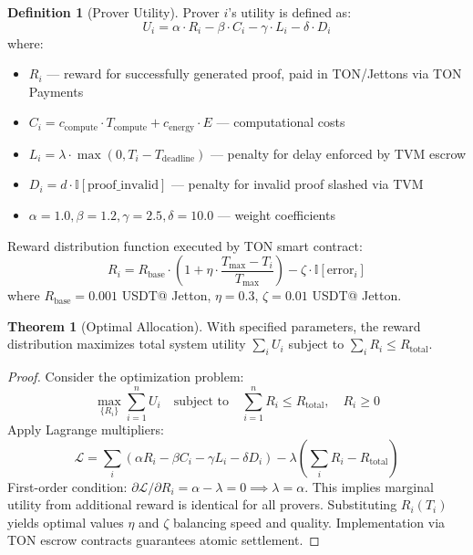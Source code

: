 \documentclass[12pt,a4paper]{article}
\theoremstyle{definition}
\newtheorem{definition}{Definition}[section]
\newtheorem{theorem}{Theorem}[section]
\theoremstyle{remark}
\begin{document}
\begin{definition}[Prover Utility]
Prover $i$'s utility is defined as:
\begin{equation}
U_i = \alpha \cdot R_i - \beta \cdot C_i - \gamma \cdot L_i - \delta \cdot D_i
\end{equation}
where:
\begin{itemize}[nosep]
    \item $R_i$ --- reward for successfully generated proof, paid in TON/Jettons via TON Payments
    \item $C_i = c_{\text{compute}} \cdot T_{\text{compute}} + c_{\text{energy}} \cdot E$ --- computational costs
    \item $L_i = \lambda \cdot \max(0, T_i - T_{\text{deadline}})$ --- penalty for delay enforced by TVM escrow
    \item $D_i = d \cdot \mathbb{I}[\text{proof\_invalid}]$ --- penalty for invalid proof slashed via TVM
    \item $\alpha = 1.0, \beta = 1.2, \gamma = 2.5, \delta = 10.0$ --- weight coefficients
\end{itemize}
\end{definition}

Reward distribution function executed by TON smart contract:
\begin{equation}
R_i = R_{\text{base}} \cdot \left(1 + \eta \cdot \frac{T_{\max} - T_i}{T_{\max}}\right) - \zeta \cdot \mathbb{I}[\text{error}_i]
\end{equation}
where $R_{\text{base}} = 0.001$ USDT@ Jetton, $\eta = 0.3$, $\zeta = 0.01$ USDT@ Jetton.

\begin{theorem}[Optimal Allocation]
\label{thm:optimal-allocation}
With specified parameters, the reward distribution maximizes total system utility $\sum_i U_i$ subject to $\sum_i R_i \leq R_{\text{total}}$.
\end{theorem}

\begin{proof}
Consider the optimization problem:
\begin{equation}
\max_{\{R_i\}} \sum_{i=1}^{n} U_i \quad \text{subject to} \quad \sum_{i=1}^{n} R_i \leq R_{\text{total}}, \quad R_i \geq 0
\end{equation}
Apply Lagrange multipliers:
\begin{equation}
\mathcal{L} = \sum_i (\alpha R_i - \beta C_i - \gamma L_i - \delta D_i) - \lambda \left(\sum_i R_i - R_{\text{total}}\right)
\end{equation}
First-order condition: $\partial \mathcal{L}/\partial R_i = \alpha - \lambda = 0 \implies \lambda = \alpha$. This implies marginal utility from additional reward is identical for all provers. Substituting $R_i(T_i)$ yields optimal values $\eta$ and $\zeta$ balancing speed and quality. Implementation via TON escrow contracts guarantees atomic settlement.
\end{proof}
\end{document}
